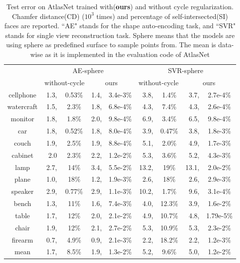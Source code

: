 \begin{table}
	\caption{Test error on AtlasNet trained with(\textbf{ours}) and without cycle regularization. Chamfer distance(CD) ($10^3$ times) and percentage of self-intersected(SI) faces are reported. ``AE" stands for the shape auto-encoding task, and ``SVR" stands for single view reconstruction task. Sphere means that the models are using sphere as predefined surface to sample points from. The mean is data-wise as it is implemented in the evaluation code of AtlasNet}
	\label{tab:atlas}
	\centering
	\begin{tabular}{c|rc|rc|rc|rc|}
		\diagbox{Category}{CD,SI}{Model} &\multicolumn{4}{c|}{AE-sphere}&\multicolumn{4}{c|}{SVR-sphere}\\
		\cline{2-9}
		~& \multicolumn{2}{c|}{without-cycle} & \multicolumn{2}{c|}{ours} & \multicolumn{2}{c|}{without-cycle} & \multicolumn{2}{c|}{ours} \\
		\hline
		cellphone&1.3,&0.53\%&1.4,&3.4e-3\%&3.8,&1.4\%&3.7,&2.7e-4\%\\
		watercraft&1.5,&2.3\%&1.8,&6.8e-4\%&4.3,&7.4\%&4.3,&2.6e-4\%\\
		monitor&1.8,&1.8\%&2.0,&9.8e-4\%&6.9,&3.4\%&6.5,&9.8e-4\%\\
		car&1.8,&0.52\%&1.8,&8.0e-4\%&3.9,&0.47\%&3.8,&1.8e-3\%\\
		couch&1.9,&2.5\%&1.9,&8.8e-4\%&5.1,&2.0\%&4.9,&1.7e-3\%\\
		cabinet&2.0&2.3\%&2.2,&1.2e-2\%&5.3,&3.6\%&5.2,&4.3e-3\%\\
		lamp&2.7,&14\%&3.4,&5.5e-2\%&13.2,&19\%&13.1,&2.0e-2\%\\
		plane&1.0,&18\%&1.2,&1.9e-3\%&2.6,&18\%&2.6,&2.9e-3\%\\
		speaker&2.9,&0.77\%&2.9,&1.1e-3\%&10.2,&1.7\%&9.6,&3.1e-4\%\\
		bench&1.3,&11\%&1.6,&7.4e-3\%&4.0,&12.3\%&3.9,&1.6e-2\%\\
		table&1.7,&12\%&2.0,&2.1e-2\%&4.9,&10.7\%&4.8,&1.79e-5\%\\
		chair&1.9,&12\%&2.1,&2.7e-2\%&5.3,&10.9\%&5.3,&2.3e-2\%\\
		firearm&0.7,&4.9\%&0.9,&2.1e-3\%&2.2,&18.2\%&2.2,&1.2e-3\%\\
		\hline
		mean &1.7,&8.5\%&1.9,& 1.3e-2\% &5.2,&9.6\%&5.0,&1.2e-2\%\\
	\end{tabular}
\end{table}

